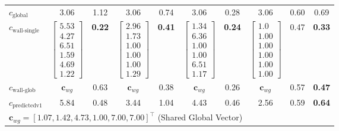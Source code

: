 \documentclass[conference]{IEEEtran}
\begin{document}
\begin{table}[h]
\begin{tabular}{l|cc|cc|cc|cc|c}
$c_{\text{global}}$
  & 3.06& 1.12& 3.06& 0.74& 3.06& 0.28& 3.06& 0.60& 0.69\\[2pt]
$c_{\text{wall-single}}$
& \multicolumn{1}{c}{$\begin{bmatrix}
           5.53 \\
           4.27 \\
           6.51 \\
 	      1.59\\
 	      4.69\\
   	    1.22 \end{bmatrix}$} & \textbf{0.22}
  & \multicolumn{1}{c}{$\begin{bmatrix}
       2.96 \\
       1.73 \\
       1.00 \\
 	    1.00\\
 	      1.00\\
   	    1.29 \end{bmatrix}$} & \textbf{0.41}
  & \multicolumn{1}{c}{$\begin{bmatrix}
           1.34   \\
           6.36  \\
           1.00  \\
 	      1.00  \\
 	      6.51 \\
   	  1.17 \end{bmatrix}$} & \textbf{0.24}
     &   \multicolumn{1}{c}{$\begin{bmatrix}
           1.0   \\
           1.00  \\
           1.00  \\
 	      1.00  \\
 	      1.00 \\
   	  1.00 \end{bmatrix}$} & 0.47  & \textbf{0.33} \\[2pt]
      \midrule
  $c_{\text{wall-glob}}$
& $\mathbf{c}_{wg}$ & 0.63 
    & $\mathbf{c}_{wg}$ & 0.38 
      & $\mathbf{c}_{wg}$ & 0.26
      & $\mathbf{c}_{wg}$ & 0.57
       & \textbf{0.47} \\[2pt]
       \midrule
   $c_{\text{predictedv1}}$
& 5.84 & 0.48
    & 3.44 & 1.04
      & 4.43 & 0.46
      & 2.56 & 0.59
       & \textbf{0.64} \\[2pt]
\bottomrule
\multicolumn{10}{l}{\footnotesize * $\mathbf{c}_{wg} = [1.07, 1.42, 4.73, 1.00, 7.00, 7.00]^\top$ (Shared Global Vector)} \\
\end{tabular}
\end{table}
\end{document}

